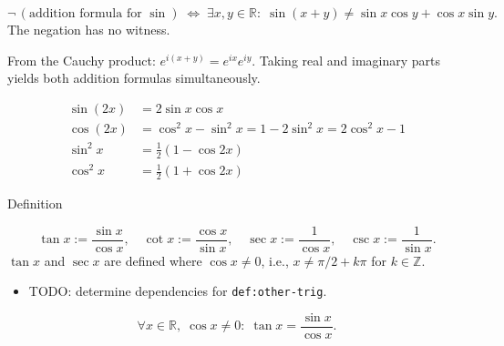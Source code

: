 \begin{remark*}
\[
  \neg\,(\text{addition formula for }\sin)
  \;\iff\;
  \exists x,y\in\mathbb{R}:\;
  \sin(x+y) \neq \sin x\cos y + \cos x\sin y.
\]
The negation has no witness.
\end{remark*}

\begin{remark*}
From the Cauchy product: $e^{i(x+y)} = e^{ix}e^{iy}$. Taking real
and imaginary parts yields both addition formulas simultaneously.
\end{remark*}

\begin{remark*}
\begin{align*}
  \sin(2x) &= 2\sin x \cos x \\
  \cos(2x) &= \cos^2 x - \sin^2 x = 1 - 2\sin^2 x = 2\cos^2 x - 1 \\
  \sin^2 x &= \tfrac{1}{2}(1 - \cos 2x) \\
  \cos^2 x &= \tfrac{1}{2}(1 + \cos 2x)
\end{align*}
\end{remark*}


\begin{definitionbox}{Definition}
\begin{definition}
\label{def:other-trig}
\[
  \tan x := \frac{\sin x}{\cos x},\quad
  \cot x := \frac{\cos x}{\sin x},\quad
  \sec x := \frac{1}{\cos x},\quad
  \csc x := \frac{1}{\sin x}.
\]
$\tan x$ and $\sec x$ are defined where $\cos x \neq 0$,
i.e., $x \neq \pi/2 + k\pi$ for $k \in \mathbb{Z}$.
\end{definition}
\end{definitionbox}

\begin{dependencies}
\begin{itemize}
  \item TODO: determine dependencies for \texttt{def:other-trig}.
\end{itemize}
\end{dependencies}

\begin{remark*}
\[
  \forall x\in\mathbb{R},\;\cos x\neq 0:\;
  \tan x = \frac{\sin x}{\cos x}.
\]
\end{remark*}

